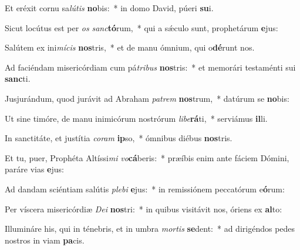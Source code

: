 \item Et eréxit cornu sa\textit{lú}\textit{tis} \textbf{no}bis:~* in domo David, púeri \textbf{su}i.
\item Sicut locútus est per \textit{os} \textit{sanc}\textbf{tó}rum,~* qui a sǽculo sunt, prophetárum \textbf{e}jus:
\item Salútem ex ini\textit{mí}\textit{cis} \textbf{nos}tris,~* et de manu ómnium, qui o\textbf{dé}runt nos.
\item Ad faciéndam misericórdiam cum pá\textit{tri}\textit{bus} \textbf{nos}tris:~* et memorári testaménti sui \textbf{sanc}ti.
\item Jusjurándum, quod jurávit ad Abraham \textit{pa}\textit{trem} \textbf{nos}trum,~* datúrum se \textbf{no}bis:
\item Ut sine timóre, de manu inimicórum nostrórum \textit{li}\textit{be}\textbf{rá}ti,~* serviámus \textbf{il}li.
\item In sanctitáte, et justítia \textit{co}\textit{ram} \textbf{ip}so,~* ómnibus diébus \textbf{nos}tris.
\item Et tu, puer, Prophéta Altíssi\textit{mi} \textit{vo}\textbf{cá}beris:~* præíbis enim ante fáciem Dómini, paráre vias \textbf{e}jus:
\item Ad dandam sciéntiam salútis \textit{ple}\textit{bi} \textbf{e}jus:~* in remissiónem peccatórum e\textbf{ó}rum:
\item Per víscera misericórdiæ \textit{De}\textit{i} \textbf{nos}tri:~* in quibus visitávit nos, óriens ex \textbf{al}to:
\item Illumináre his, qui in ténebris, et in umbra \textit{mor}\textit{tis} \textbf{se}dent:~* ad dirigéndos pedes nostros in viam \textbf{pa}cis.
